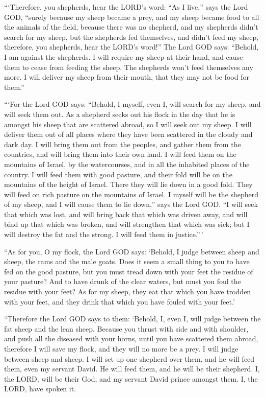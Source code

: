  ```Therefore, you shepherds, hear the LORD's word:
 ``As I live,'' says the Lord GOD, ``surely because my sheep
became a prey, and my sheep became food to all the animals of the field,
because there was no shepherd, and my shepherds didn't search for my
sheep, but the shepherds fed themselves, and didn't feed my sheep,
 therefore, you shepherds, hear the LORD's word!''
 The Lord GOD says: ``Behold, I am against the shepherds. I
will require my sheep at their hand, and cause them to cease from
feeding the sheep. The shepherds won't feed themselves any more. I will
deliver my sheep from their mouth, that they may not be food for them.''

 ```For the Lord GOD says: ``Behold, I myself, even I, will
search for my sheep, and will seek them out.  As a shepherd
seeks out his flock in the day that he is amongst his sheep that are
scattered abroad, so I will seek out my sheep. I will deliver them out
of all places where they have been scattered in the cloudy and dark day.
 I will bring them out from the peoples, and gather them
from the countries, and will bring them into their own land. I will feed
them on the mountains of Israel, by the watercourses, and in all the
inhabited places of the country.  I will feed them with
good pasture, and their fold will be on the mountains of the height of
Israel. There they will lie down in a good fold. They will feed on rich
pasture on the mountains of Israel.  I myself will be the
shepherd of my sheep, and I will cause them to lie down,'' says the Lord
GOD.  ``I will seek that which was lost, and will bring
back that which was driven away, and will bind up that which was broken,
and will strengthen that which was sick; but I will destroy the fat and
the strong. I will feed them in justice.''\,'

 ``As for you, O my flock, the Lord GOD says: `Behold, I
judge between sheep and sheep, the rams and the male goats.
 Does it seem a small thing to you to have fed on the good
pasture, but you must tread down with your feet the residue of your
pasture? And to have drunk of the clear waters, but must you foul the
residue with your feet?  As for my sheep, they eat that
which you have trodden with your feet, and they drink that which you
have fouled with your feet.'

 ``Therefore the Lord GOD says to them: `Behold, I, even I,
will judge between the fat sheep and the lean sheep. 
Because you thrust with side and with shoulder, and push all the
diseased with your horns, until you have scattered them abroad,
 therefore I will save my flock, and they will no more be a
prey. I will judge between sheep and sheep.  I will set up
one shepherd over them, and he will feed them, even my servant David. He
will feed them, and he will be their shepherd.  I, the
LORD, will be their God, and my servant David prince amongst them. I,
the LORD, have spoken it.

